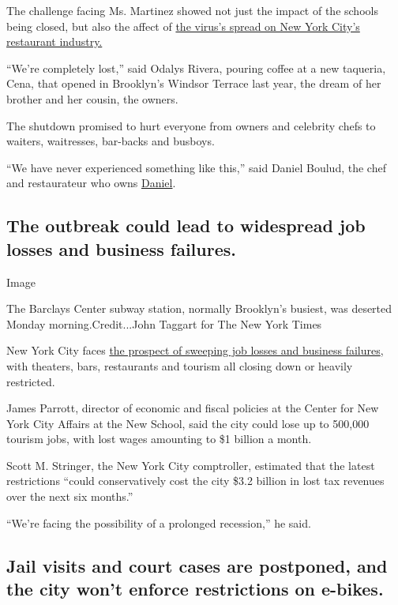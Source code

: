 The challenge facing Ms. Martinez showed not just the impact of the
schools being closed, but also the affect of
\href{https://www.nytimes3xbfgragh.onion/2020/03/16/nyregion/nyc-closing-bars-restaurants-coronavirus.html}{the
virus's spread on New York City's restaurant industry.}

``We're completely lost,'' said Odalys Rivera, pouring coffee at a new
taqueria, Cena, that opened in Brooklyn's Windsor Terrace last year, the
dream of her brother and her cousin, the owners.

The shutdown promised to hurt everyone from owners and celebrity chefs
to waiters, waitresses, bar-backs and busboys.

``We have never experienced something like this,'' said Daniel Boulud,
the chef and restaurateur who owns
\href{https://www.nytimes3xbfgragh.onion/2013/07/24/dining/reviews/restaurant-review-daniel-on-the-upper-east-side.html}{Daniel}.

\hypertarget{the-outbreak-could-lead-to-widespread-job-losses-and-business-failures}{%
\subsection{The outbreak could lead to widespread job losses and
business
failures.}\label{the-outbreak-could-lead-to-widespread-job-losses-and-business-failures}}

Image

The Barclays Center subway station, normally Brooklyn's busiest, was
deserted Monday morning.Credit...John Taggart for The New York Times

New York City faces
\href{https://www.nytimes3xbfgragh.onion/2020/03/16/nyregion/Coronavirus-nyc-economy-.html}{the
prospect of sweeping job losses and business failures}, with theaters,
bars, restaurants and tourism all closing down or heavily restricted.

James Parrott, director of economic and fiscal policies at the Center
for New York City Affairs at the New School, said the city could lose up
to 500,000 tourism jobs, with lost wages amounting to \$1 billion a
month.

Scott M. Stringer, the New York City comptroller, estimated that the
latest restrictions ``could conservatively cost the city \$3.2 billion
in lost tax revenues over the next six months.''

``We're facing the possibility of a prolonged recession,'' he said.

\hypertarget{jail-visits-and-court-cases-are-postponed-and-the-city-wont-enforce-restrictions-on-e-bikes}{%
\subsection{Jail visits and court cases are postponed, and the city
won't enforce restrictions on
e-bikes.}\label{jail-visits-and-court-cases-are-postponed-and-the-city-wont-enforce-restrictions-on-e-bikes}}

